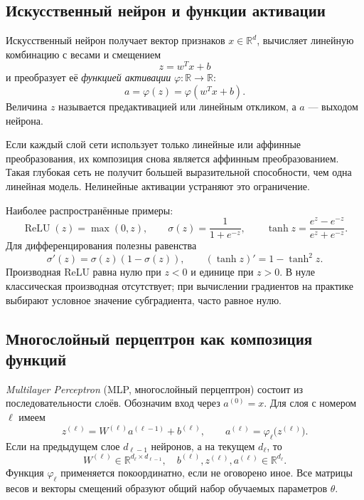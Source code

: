 \documentclass[12pt,a4paper]{article}
\newcommand{\R}{\mathbb{R}}
\begin{document}
\subsection{Искусственный нейрон и функции активации}

Искусственный нейрон получает вектор признаков $x\in\R^d$,
вычисляет линейную комбинацию с весами и смещением
\[
    z=w^Tx+b
\]
и преобразует её \emph{функцией активации}
$\varphi:\R\to\R$:
\begin{equation}
    a=\varphi(z)=\varphi(w^Tx+b).
    \label{eq:neuron}
\end{equation}
Величина $z$ называется предактивацией или линейным откликом,
а $a$ --- выходом нейрона.

Если каждый слой сети использует только линейные или
аффинные преобразования, их композиция снова является аффинным
преобразованием. Такая глубокая сеть не получит большей
выразительной способности, чем одна линейная модель.
Нелинейные активации устраняют это ограничение.

Наиболее распространённые примеры:
\[
    \operatorname{ReLU}(z)=\max(0,z),\qquad
    \sigma(z)=\frac1{1+e^{-z}},\qquad
    \tanh z=\frac{e^z-e^{-z}}{e^z+e^{-z}}.
\]
Для дифференцирования полезны равенства
\[
    \sigma'(z)=\sigma(z)(1-\sigma(z)),
    \qquad (\tanh z)'=1-\tanh^2z.
\]
Производная ReLU равна нулю при $z<0$ и единице при $z>0$.
В нуле классическая производная отсутствует; при вычислении
градиентов на практике выбирают условное значение субградиента,
часто равное нулю.

\subsection{Многослойный перцептрон как композиция функций}

\emph{Multilayer Perceptron} (MLP, многослойный перцептрон)
состоит из последовательности слоёв. Обозначим вход
через $a^{(0)}=x$. Для слоя с номером $\ell$ имеем
\begin{equation}
    z^{(\ell)}=W^{(\ell)}a^{(\ell-1)}+b^{(\ell)},
    \qquad
    a^{(\ell)}=\varphi_\ell\bigl(z^{(\ell)}\bigr).
    \label{eq:mlp-layer}
\end{equation}
Если на предыдущем слое $d_{\ell-1}$ нейронов, а
на текущем $d_\ell$, то
\[
    W^{(\ell)}\in\R^{d_\ell\times d_{\ell-1}},
    \quad b^{(\ell)},z^{(\ell)},a^{(\ell)}\in\R^{d_\ell}.
\]
Функция $\varphi_\ell$ применяется покоординатно,
если не оговорено иное. Все матрицы весов и векторы смещений
образуют общий набор обучаемых параметров $\theta$.
\end{document}
